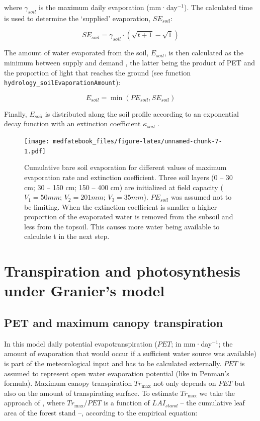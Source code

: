 \documentclass[]{book}
\begin{document}
where \(\gamma_{soil}\) is the maximum daily evaporation
(mm·day\(^{-1}\)). The calculated time is used to determine the
`supplied' evaporation, \(SE_{soil}\):

\begin{equation}
SE_{soil} = \gamma_{soil} \cdot (\sqrt{t+1}-\sqrt{1})
\end{equation}

The amount of water evaporated from the soil, \(E_{soil}\), is then
calculated as the minimum between supply and demand \citep{Federer1982},
the latter being the product of PET and the proportion of light that
reaches the ground (see function
\texttt{hydrology\_soilEvaporationAmount}):

\begin{equation}
E_{soil} = \min(PE_{soil}, SE_{soil})
\end{equation}

Finally, \(E_{soil}\) is distributed along the soil profile according to
an exponential decay function with an extinction coefficient
\(\kappa_{soil}\) \citep{Mouillot2001}.

\begin{figure}
\centering
\texttt{[image: medfatebook\_files/figure-latex/unnamed-chunk-7-1.pdf]}
\caption{\label{fig:unnamed-chunk-7}Cumulative bare soil evaporation for
different values of maximum evaporation rate and extinction coefficient.
Three soil layers (0 -- 30 cm; 30 -- 150 cm; 150 -- 400 cm) are
initialized at field capacity (\(V_1 = 50 mm\); \(V_2 = 201 mm\);
\(V_3 = 35 mm\)). \(PE_{soil}\) was assumed not to be limiting. When the
extinction coefficient is smaller a higher proportion of the evaporated
water is removed from the subsoil and less from the topsoil. This causes
more water being available to calculate t in the next step.}
\end{figure}

\chapter{Transpiration and photosynthesis under Granier's
model}\label{transpirationgranier}

\section{PET and maximum canopy
transpiration}\label{pet-and-maximum-canopy-transpiration}

In this model daily potential evapotranspiration (\(PET\); in
mm·day\(^{-1}\); the amount of evaporation that would occur if a
sufficient water source was available) is part of the meteorological
input and has to be calculated externally. \(PET\) is assumed to
represent open water evaporation potential (like in Penman's formula).
Maximum canopy transpiration \(Tr_{\max}\) not only depends on \(PET\)
but also on the amount of transpirating surface. To estimate
\(Tr_{\max}\) we take the approach of \citet{Granier1999}, where
\(Tr_{\max}/PET\) is a function of \(LAI_{stand}\) -- the cumulative
leaf area of the forest stand --, according to the empirical equation:
\end{document}
